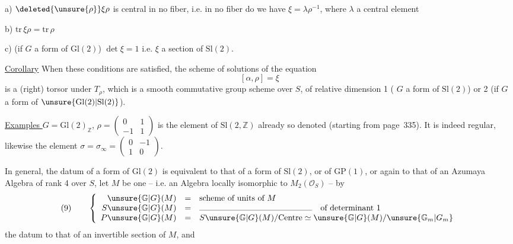 a) $\deleted{\unsure{\rho}}\xi\rho$ is central in no fiber, i.e. in no fiber do we have $\xi=\lambda\rho^{-1}$, where $\lambda$  a central element

b) $\mathrm{tr}\,\xi\rho=\mathrm{tr}\,\rho$

c) (if $G$ a form of $\mathrm{Gl}(2)$) $\det\xi=1$ i.e. $\xi$ a section of $\mathrm{Sl}(2)$.


\uline{Corollary} When these conditions are satisfied, the scheme of solutions  of the equation
\[
[\alpha,\rho]=\xi
\]
is a (right) torsor under $T_\rho$, which is a smooth commutative group scheme over $S$, of relative dimension 1 ( $G$ a form of $\mathrm{Sl}(2)$) or 2 (if $G$ a form of $\unsure{\mathrm{Gl}(2)|\mathrm{Sl}(2)}$).

\uline{Examples } $G=\mathrm{Gl}(2)_{\mathbb Z}$, $\rho=\begin{pmatrix}0&1\\-1&1\end{pmatrix}$ is the element of $\mathrm{Sl}(2,\mathbb Z)$ already so denoted (starting from page~335). It is indeed regular,  likewise the element $\sigma=\sigma_\infty=\begin{pmatrix}0&-1\\1&0\end{pmatrix}$.

In general, the datum of a form of $\mathrm{Gl}(2)$ is equivalent to that of a form of $\mathrm{Sl}(2)$, or of $\mathrm{GP}(1)$, or again to that of an Azumaya Algebra of rank 4 over $S$, let $M$ be one -- i.e. an Algebra locally  isomorphic to $M_2(\mathcal O_S)$ -- by
\[
(9)\qquad
\left\{
\begin{array}{rcl}
\unsure{\mathbb G|G}(M)&=&\text{scheme of units of }M\\
S\unsure{\mathbb G|G}(M)&=&\rule{4.8cm}{0.3pt}\quad\text{of determinant }1\\
P\unsure{\mathbb G|G}(M)&=&S\unsure{\mathbb G|G}(M)/\mathrm{Centre}\simeq\unsure{\mathbb G|G}(M)/\unsure{\mathbb G_m|G_m}
\end{array}
\right.
\]
 the datum   to that of an invertible section of $M$, and

